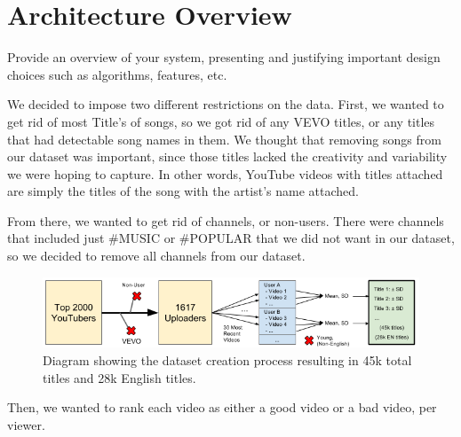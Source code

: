\documentclass[a4paper,12pt]{article}
\begin{document}
\section{Architecture Overview}
Provide an overview of your system, presenting and justifying important design choices such as algorithms, features, etc.



We decided to impose two different restrictions on the data. First, we wanted to get rid of most Title's of songs, so we got rid of any VEVO titles, or any titles that had detectable song names in them. We thought that removing songs from our dataset was important, since those titles lacked the creativity and variability we were hoping to capture. In other words, YouTube videos with titles attached are simply the titles of the song with the artist's name attached. 

From there, we wanted to get rid of channels, or non-users. There were channels that included just \#MUSIC or \#POPULAR that we did not want in our dataset, so we decided to remove all channels from our dataset. 


\begin{figure}[h]
    \centering
    \includegraphics[width=.99\textwidth]{dataset}
    \caption{Diagram showing the dataset creation process resulting in 45k total titles and 28k English titles.}
    \label{fig:dataset}
\end{figure}

Then, we wanted to rank each video as either a good video or a bad video, per viewer. 
\end{document}
